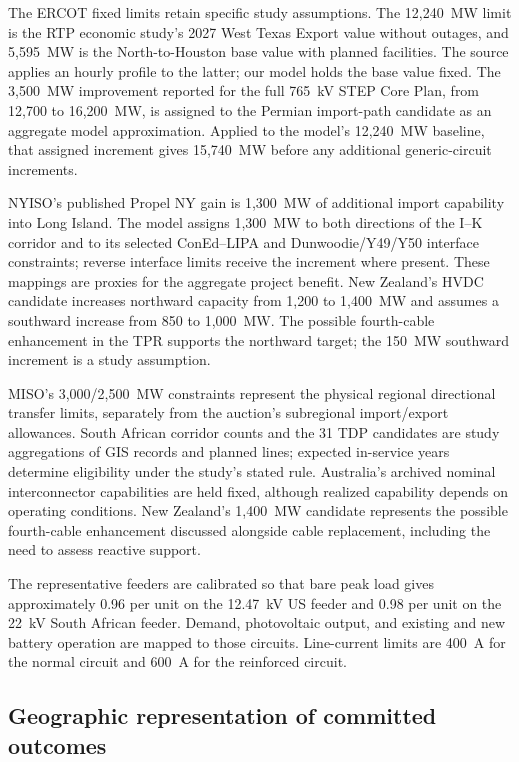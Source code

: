 \documentclass[pdflatex,sn-nature]{sn-jnl}
\begin{document}
The ERCOT fixed limits retain specific study assumptions. The 12,240~MW limit is the RTP economic study's 2027 West Texas Export value without outages, and 5,595~MW is the North-to-Houston base value with planned facilities. The source applies an hourly profile to the latter; our model holds the base value fixed. The 3,500~MW improvement reported for the full 765~kV STEP Core Plan, from 12,700 to 16,200~MW, is assigned to the Permian import-path candidate as an aggregate model approximation. Applied to the model's 12,240~MW baseline, that assigned increment gives 15,740~MW before any additional generic-circuit increments.

NYISO's published Propel NY gain is 1,300~MW of additional import capability into Long Island. The model assigns 1,300~MW to both directions of the I--K corridor and to its selected ConEd--LIPA and Dunwoodie/Y49/Y50 interface constraints; reverse interface limits receive the increment where present. These mappings are proxies for the aggregate project benefit. New Zealand's HVDC candidate increases northward capacity from 1,200 to 1,400~MW and assumes a southward increase from 850 to 1,000~MW. The possible fourth-cable enhancement in the TPR supports the northward target; the 150~MW southward increment is a study assumption.

MISO's 3,000/2,500~MW constraints represent the physical regional directional transfer limits, separately from the auction's subregional import/export allowances. South African corridor counts and the 31 TDP candidates are study aggregations of GIS records and planned lines; expected in-service years determine eligibility under the study's stated rule. Australia's archived nominal interconnector capabilities are held fixed, although realized capability depends on operating conditions. New Zealand's 1,400~MW candidate represents the possible fourth-cable enhancement discussed alongside cable replacement, including the need to assess reactive support.

The representative feeders are calibrated so that bare peak load gives approximately 0.96 per unit on the 12.47~kV US feeder and 0.98 per unit on the 22~kV South African feeder. Demand, photovoltaic output, and existing and new battery operation are mapped to those circuits. Line-current limits are 400~A for the normal circuit and 600~A for the reinforced circuit.

\subsection{Geographic representation of committed outcomes}\label{sec:geographic-methods}
\end{document}
